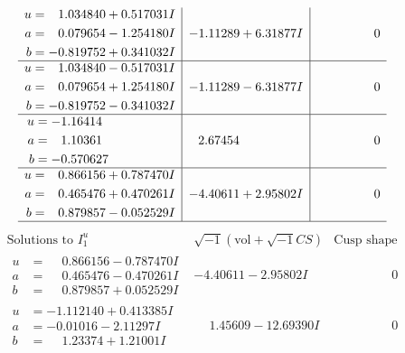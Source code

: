 \documentclass[1p]{elsarticle_modified}
\theoremstyle{definition}
\newcommand{\I}{\sqrt{-1}}
\begin{document}
$$\begin{array}{c|c|c}
\begin{aligned}
u &= \phantom{-}1.034840 + 0.517031 I \\
a &= \phantom{-}0.079654 - 1.254180 I \\
b &= -0.819752 + 0.341032 I\end{aligned}
 & -1.11289 + 6.31877 I & \phantom{-0.000000 } 0 \\ \hline\begin{aligned}
u &= \phantom{-}1.034840 - 0.517031 I \\
a &= \phantom{-}0.079654 + 1.254180 I \\
b &= -0.819752 - 0.341032 I\end{aligned}
 & -1.11289 - 6.31877 I & \phantom{-0.000000 } 0 \\ \hline\begin{aligned}
u &= -1.16414\phantom{ +0.000000I} \\
a &= \phantom{-}1.10361\phantom{ +0.000000I} \\
b &= -0.570627\phantom{ +0.000000I}\end{aligned}
 & \phantom{-}2.67454\phantom{ +0.000000I} & \phantom{-0.000000 } 0 \\ \hline\begin{aligned}
u &= \phantom{-}0.866156 + 0.787470 I \\
a &= \phantom{-}0.465476 + 0.470261 I \\
b &= \phantom{-}0.879857 - 0.052529 I\end{aligned}
 & -4.40611 + 2.95802 I & \phantom{-0.000000 } 0\\
 \hline 
 \end{array}$$\newpage$$\begin{array}{c|c|c}  
\text{Solutions to }I^u_{1}& \I (\text{vol} + \sqrt{-1}CS) & \text{Cusp shape}\\
 \hline 
\begin{aligned}
u &= \phantom{-}0.866156 - 0.787470 I \\
a &= \phantom{-}0.465476 - 0.470261 I \\
b &= \phantom{-}0.879857 + 0.052529 I\end{aligned}
 & -4.40611 - 2.95802 I & \phantom{-0.000000 } 0 \\ \hline\begin{aligned}
u &= -1.112140 + 0.413385 I \\
a &= -0.01016 - 2.11297 I \\
b &= \phantom{-}1.23374 + 1.21001 I\end{aligned}
 & \phantom{-}1.45609 - 12.69390 I & \phantom{-0.000000 } 0 \\ \hline\begin{aligned}

\end{aligned}
\end{array}$$
\end{document}
